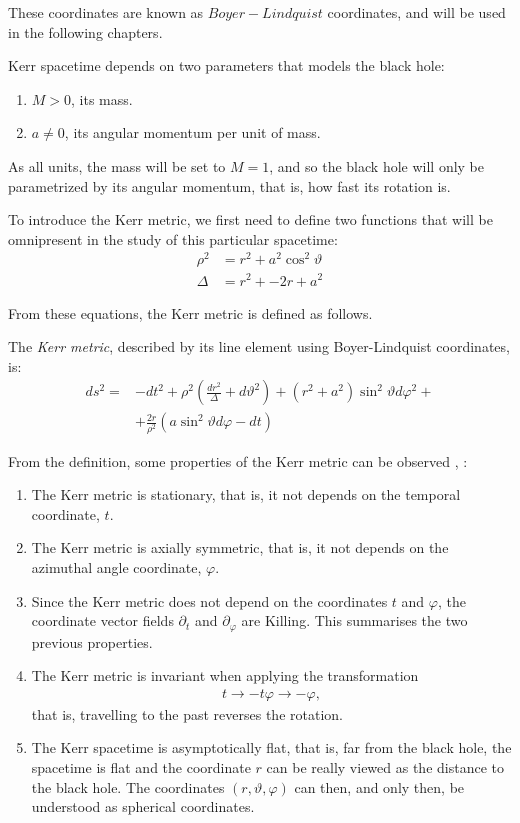 These coordinates are known as $Boyer-Lindquist$ coordinates, and will be used in the following chapters.


Kerr spacetime depends on two parameters that models the black hole:
\begin{enumerate}
	\item $M > 0$, its mass.
	\item $a \neq 0$, its angular momentum per unit of mass.
\end{enumerate}

As all units, the mass will be set to $M = 1$, and so the black hole will only be parametrized by its angular momentum, that is, how fast its rotation is.

To introduce the Kerr metric, we first need to define two functions that will be omnipresent in the study of this particular spacetime:
\begin{align}
	\rho^2 &= r^2 + a^2\cos^2\vartheta \\
	\Delta &= r^2 + -2r + a^2
\end{align}

From these equations, the Kerr metric is defined as follows.
\begin{definition}
	The \emph{Kerr metric}, described by its line element using Boyer-Lindquist coordinates, is:
	\begin{align}
		\label{eq:kerrmetric}
		ds^2 = &-dt^2 + \rho^2\left(\frac{dr^2}{\Delta} + d\vartheta^2\right) + \left(r^2 + a^2\right)\sin^2\vartheta d\varphi^2 + \\
		\nonumber
		&+ \frac{2r}{\rho^2}\left(a\sin^2\vartheta d\varphi - dt\right)
	\end{align}
\end{definition}

From the definition, some properties of the Kerr metric can be observed \cite[Sec. 2.1]{galindo14}, \cite[pp. 58-59]{oneill95}:
\begin{enumerate}
	\item The Kerr metric is stationary, that is, it not depends on the temporal coordinate, $t$.
	\item The Kerr metric is axially symmetric, that is, it not depends on the azimuthal angle coordinate, $\varphi$.
	\item Since the Kerr metric does not depend on the coordinates $t$ and $\varphi$, the coordinate vector fields $\partial_t$ and $\partial_\varphi$ are Killing. This summarises the two previous properties.
	\item The Kerr metric is invariant when applying the transformation
	\begin{align*}
		t \to -t
		\varphi \to -\varphi,
	\end{align*}
	that is, travelling to the past reverses the rotation.
	\item The Kerr spacetime is asymptotically flat, that is, far from the black hole, the spacetime is flat and the coordinate $r$ can be really viewed as the distance to the black hole. The coordinates $(r, \vartheta, \varphi)$ can then, and only then, be understood as spherical coordinates.
\end{enumerate}

